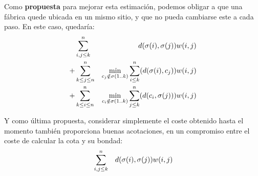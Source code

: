 \documentclass[a4paper, 11pt]{article} %
\begin{document}
      Como \textbf{propuesta} para mejorar esta estimación, podemos obligar a que una fábrica quede ubicada en un mismo sitio,
      y que no pueda cambiarse este a cada paso. En este caso, quedaría:
      \begin{eqnarray*}
      \displaystyle
	  & \sum_{i,j \leq k}^n & d(\sigma(i),\sigma(j)) w(i,j) \\
	+ & \sum_{k\leq j \leq n}^n & \min_{c_j \notin \sigma(1..k)}{\sum^n_{i\leq k} (d(\sigma(i),c_j))} w(i,j) \\
	+ & \sum_{k\leq i \leq n}^n & \min_{c_i \notin \sigma(1..k)}{\sum^n_{j\leq k} (d(c_i, \sigma(j)))} w(i,j) \\
      \end{eqnarray*}

      
      Y como última propuesta, considerar simplemente el coste obtenido hasta el momento también proporciona
      buenas acotaciones, en un compromiso entre el coste de calcular la cota y su bondad:
      \begin{eqnarray*}
      \displaystyle
	  & \sum_{i,j \leq k}^n & d(\sigma(i),\sigma(j)) w(i,j)
      \end{eqnarray*}
      
\end{document}
